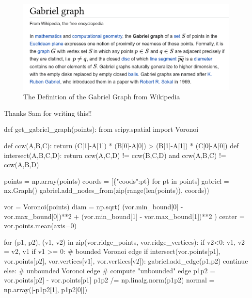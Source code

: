 \begin{figure}[H]
  \centering
  \includegraphics[width=12cm]{miscimages/gabriel-definition.png}
  \caption{\label{fig:gabriel-defn} The Definition of the Gabriel Graph from Wikipedia}
\end{figure}


Thanks Sam for writing this!!

\nwenddocs{}\plusendmoddef\nwstartdeflinemarkup{}\nwenddeflinemarkup
def get_gabriel_graph(points):
    from scipy.spatial import Voronoi
    
    def ccw(A,B,C):
        return (C[1]-A[1]) * (B[0]-A[0]) > (B[1]-A[1]) * (C[0]-A[0])
    def intersect(A,B,C,D):
        return ccw(A,C,D) != ccw(B,C,D) and ccw(A,B,C) != ccw(A,B,D)
    
    points = np.array(points)
    coords = [\{"coods":pt\} for pt in points]
    gabriel = nx.Graph()
    gabriel.add_nodes_from(zip(range(len(points)), coords))

    vor = Voronoi(points)
    diam = np.sqrt( (vor.min_bound[0] - vor.max_bound[0])**2 +
                    (vor.min_bound[1] - vor.max_bound[1])**2 )
    center = vor.points.mean(axis=0)
    
    for (p1, p2), (v1, v2) in zip(vor.ridge_points, vor.ridge_vertices):
        if v2<0:
            v1, v2 = v2, v1
        if v1 >= 0: # bounded Voronoi edge
            if intersect(vor.points[p1], vor.points[p2],
                         vor.vertices[v1], vor.vertices[v2]):
                gabriel.add_edge(p1,p2)
            continue
        else: # unbounded Voronoi edge
            # compute "unbounded" edge
            p1p2 = vor.points[p2] - vor.points[p1]
            p1p2 /= np.linalg.norm(p1p2)
            normal = np.array([-p1p2[1], p1p2[0]])

